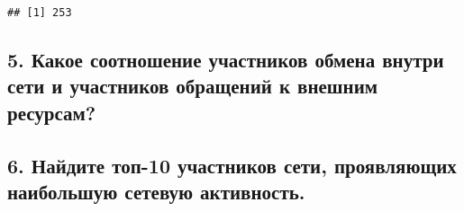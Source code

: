 \documentclass[
]{article}
\begin{document}
\begin{verbatim}
## [1] 253
\end{verbatim}

\hypertarget{ux43aux430ux43aux43eux435-ux441ux43eux43eux442ux43dux43eux448ux435ux43dux438ux435-ux443ux447ux430ux441ux442ux43dux438ux43aux43eux432-ux43eux431ux43cux435ux43dux430-ux432ux43dux443ux442ux440ux438-ux441ux435ux442ux438-ux438-ux443ux447ux430ux441ux442ux43dux438ux43aux43eux432-ux43eux431ux440ux430ux449ux435ux43dux438ux439-ux43a-ux432ux43dux435ux448ux43dux438ux43c-ux440ux435ux441ux443ux440ux441ux430ux43c}{%
\subsection{5. Какое соотношение участников обмена внутри сети и
участников обращений к внешним
ресурсам?}\label{ux43aux430ux43aux43eux435-ux441ux43eux43eux442ux43dux43eux448ux435ux43dux438ux435-ux443ux447ux430ux441ux442ux43dux438ux43aux43eux432-ux43eux431ux43cux435ux43dux430-ux432ux43dux443ux442ux440ux438-ux441ux435ux442ux438-ux438-ux443ux447ux430ux441ux442ux43dux438ux43aux43eux432-ux43eux431ux440ux430ux449ux435ux43dux438ux439-ux43a-ux432ux43dux435ux448ux43dux438ux43c-ux440ux435ux441ux443ux440ux441ux430ux43c}}

\hypertarget{ux43dux430ux439ux434ux438ux442ux435-ux442ux43eux43f-10-ux443ux447ux430ux441ux442ux43dux438ux43aux43eux432-ux441ux435ux442ux438-ux43fux440ux43eux44fux432ux43bux44fux44eux449ux438ux445-ux43dux430ux438ux431ux43eux43bux44cux448ux443ux44e-ux441ux435ux442ux435ux432ux443ux44e-ux430ux43aux442ux438ux432ux43dux43eux441ux442ux44c.}{%
\subsection{6. Найдите топ-10 участников сети, проявляющих наибольшую
сетевую
активность.}\label{ux43dux430ux439ux434ux438ux442ux435-ux442ux43eux43f-10-ux443ux447ux430ux441ux442ux43dux438ux43aux43eux432-ux441ux435ux442ux438-ux43fux440ux43eux44fux432ux43bux44fux44eux449ux438ux445-ux43dux430ux438ux431ux43eux43bux44cux448ux443ux44e-ux441ux435ux442ux435ux432ux443ux44e-ux430ux43aux442ux438ux432ux43dux43eux441ux442ux44c.}}
\end{document}
